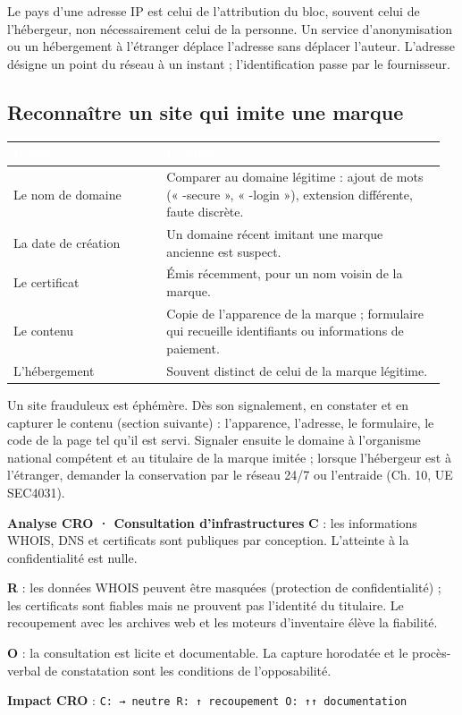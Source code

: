 \begin{boxalert}
Le pays d'une adresse IP est celui de l'attribution du bloc, souvent celui de l'hébergeur, non nécessairement celui de la personne. Un service d'anonymisation ou un hébergement à l'étranger déplace l'adresse sans déplacer l'auteur. L'adresse désigne un point du réseau à un instant ; l'identification passe par le fournisseur.
\end{boxalert}

\subsection{Reconnaître un site qui imite une marque}

\begin{longtable}{p{0.34\linewidth}p{0.62\linewidth}}
\rowcolor{TableauEntete}\textcolor{white}{\bfseries Indice} & \textcolor{white}{\bfseries Lecture} \\ \hline
Le nom de domaine & Comparer au domaine légitime : ajout de mots (« -secure », « -login »), extension différente, faute discrète. \\
La date de création & Un domaine récent imitant une marque ancienne est suspect. \\
Le certificat & Émis récemment, pour un nom voisin de la marque. \\
Le contenu & Copie de l'apparence de la marque ; formulaire qui recueille identifiants ou informations de paiement. \\
L'hébergement & Souvent distinct de celui de la marque légitime. \\
\end{longtable}

Un site frauduleux est éphémère. Dès son signalement, en constater et en capturer le contenu (section suivante) : l'apparence, l'adresse, le formulaire, le code de la page tel qu'il est servi. Signaler ensuite le domaine à l'organisme national compétent et au titulaire de la marque imitée ; lorsque l'hébergeur est à l'étranger, demander la conservation par le réseau 24/7 ou l'entraide (Ch. 10, UE SEC4031).

\begin{boxCRO}
\textbf{Analyse CRO · Consultation d'infrastructures}
\textbf{C} : les informations WHOIS, DNS et certificats sont publiques par conception. L'atteinte à la confidentialité est nulle.

\textbf{R} : les données WHOIS peuvent être masquées (protection de confidentialité) ; les certificats sont fiables mais ne prouvent pas l'identité du titulaire. Le recoupement avec les archives web et les moteurs d'inventaire élève la fiabilité.

\textbf{O} : la consultation est licite et documentable. La capture horodatée et le procès-verbal de constatation sont les conditions de l'opposabilité.

\textbf{Impact CRO} : \texttt{C: → neutre \quad R: ↑ recoupement \quad O: ↑↑ documentation}
\end{boxCRO}

